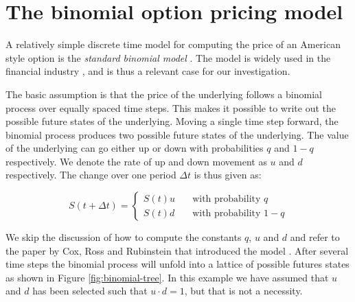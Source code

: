 \section{The binomial option pricing model}
A relatively simple discrete time model for computing the price of an
American style option is the \emph{standard binomial model}
\cite{cox1979option}. The model is widely used in the financial
industry \cite{ganesan2009acceleration}, and is thus a relevant case
for our investigation.

The basic assumption is that the price of the underlying follows a
binomial process over equally spaced time steps. This makes it
possible to write out the possible future states of the
underlying. Moving a single time step forward, the binomial process
produces two possible future states of the underlying. The value of
the underlying can go either up or down with probabilities $q$ and $1
- q$ respectively. We denote the rate of up and down movement as $u$
and $d$ respectively. The change over one period $\Delta t$ is thus
given as:

$$S(t+\Delta t) = \left\{
  \begin{array}{ll}
    S(t)u & \quad \text{with probability $q$} \\
    S(t)d & \quad \text{with probability $1-q$}
  \end{array} \right.
$$

We skip the discussion of how to compute the constants $q$, $u$ and
$d$ and refer to the paper by Cox, Ross and Rubinstein that introduced
the model \cite{cox1979option}. After several time steps the binomial
process will unfold into a lattice of possible futures states as shown
in Figure \ref{fig:binomial-tree}. In this example we have assumed
that $u$ and $d$ has been selected such that $u\cdot d = 1$, but that
is not a necessity.

